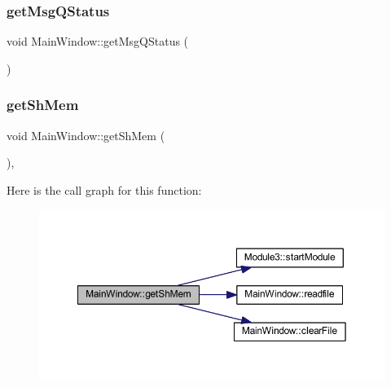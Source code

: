 \subsubsection{\texorpdfstring{get\+Msg\+Q\+Status}{getMsgQStatus}}
{\footnotesize\ttfamily void Main\+Window\+::get\+Msg\+Q\+Status (\begin{DoxyParamCaption}{ }\end{DoxyParamCaption})\hspace{0.3cm}{\ttfamily [signal]}}

\mbox{\label{class_main_window_a707b068e9373c76cbb4d844b15d4b509}} 
\subsubsection{\texorpdfstring{get\+Sh\+Mem}{getShMem}}
{\footnotesize\ttfamily void Main\+Window\+::get\+Sh\+Mem (\begin{DoxyParamCaption}{ }\end{DoxyParamCaption})\hspace{0.3cm}{\ttfamily [private]}, {\ttfamily [slot]}}

Here is the call graph for this function\+:
\nopagebreak
\begin{figure}[H]
\begin{center}
\leavevmode
\includegraphics[width=350pt]{class_main_window_a707b068e9373c76cbb4d844b15d4b509_cgraph}
\end{center}
\end{figure}
\mbox{\label{class_main_window_a491881163b44282206d1313243af5e2f}} 
